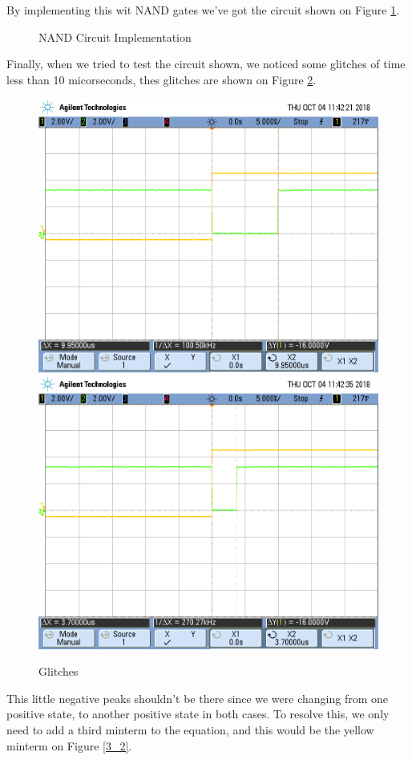 By implementing this wit NAND gates we've got the circuit shown on
Figure \ref{3_3}.

\begin{figure}[H]

\caption{NAND Circuit Implementation}
\label{3_3}

\end{figure}

Finally, when we tried to test the circuit shown, we noticed some
glitches of time less than 10 micorseconds, thes glitches are shown
on Figure \ref{3_4}.

\begin{figure}[H]
\begin{centering}
\includegraphics[scale=0.25]{images/e3}\includegraphics[scale=0.25]{images/e4}
\par\end{centering}
\caption{Glitches}
\label{3_4}

\end{figure}

This little negative peaks shouldn't be there since we were changing
from one positive state, to another positive state in both cases.
To resolve this, we only need to add a third minterm to the equation,
and this would be the yellow minterm on Figure \ref{3_2}.
